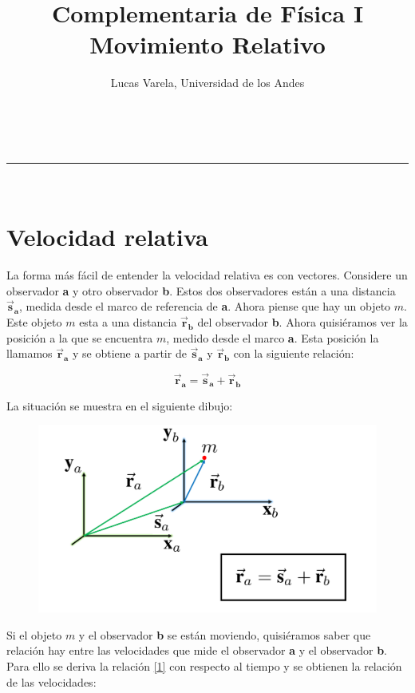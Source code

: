\documentclass[a4paper,11pt]{article}
\makeatletter
\newcommand{\linia}{\rule{\linewidth}{0.5pt}}
\theoremstyle{mytheor}
\renewcommand{\maketitle}{
\begin{center}
\vspace{2ex}
{\huge \textsc{\@title}}
\vspace{1ex}
\\
\linia\\
\@author \hfill \@date
\vspace{4ex}
\end{center}
}
\makeatother
\begin{document}
\title{Complementaria de Física I \\ Movimiento Relativo}

\author{Lucas Varela, Universidad de los Andes}


\date{}
\maketitle

\section{Velocidad relativa}

La forma más fácil de entender la velocidad relativa es con vectores. Considere un observador \textbf{a} y otro observador \textbf{b}. Estos dos observadores están a una distancia $\vec{\textbf{s}}_{\textbf{a}}$, medida desde el marco de referencia de \textbf{a}. Ahora piense que hay un objeto $m$. Este objeto $m$ esta a una distancia $\vec{\textbf{r}}_{\textbf{b}}$ del observador \textbf{b}. Ahora quisiéramos ver la posición a la que se encuentra $m$, medido desde el marco \textbf{a}. Esta posición la llamamos $\vec{\textbf{r}}_{\textbf{a}}$ y se obtiene a partir de $\vec{\textbf{s}}_{\textbf{a}}$ y $\vec{\textbf{r}}_{\textbf{b}}$ con la siguiente relación:


\begin{equation}\label{1}
\vec{\textbf{r}}_{\textbf{a}} = \vec{\textbf{s}}_{\textbf{a}} + \vec{\textbf{r}}_{\textbf{b}}
\end{equation}


La situación se muestra en el siguiente dibujo:

\begin{figure}[h]
		\includegraphics[width=.9\linewidth]{mvtorela}
		\label{fcN4}
\end{figure}


Si el objeto $m$ y el observador \textbf{b} se están moviendo, quisiéramos saber que relación hay entre las velocidades que mide el observador \textbf{a} y el observador \textbf{b}. Para ello se deriva la relación \ref{1} con respecto al tiempo y se obtienen la relación de las velocidades:
\end{document}
